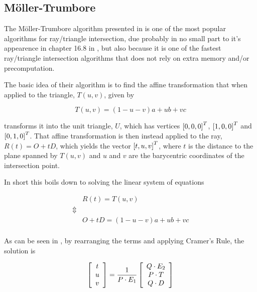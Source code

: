 \subsection{Möller-Trumbore}


The Möller-Trumbore algorithm presented in 
is one of the most popular algorithms for ray/triangle intersection,
due probably in no small part to it's appearence in chapter 16.8 in
, but also because it is one of the fastest
ray/triangle intersection algorithms that does not rely on extra
memory and/or precomputation.



The basic idea of their algorithm is to find the affine transformation
that when applied to the triangle, $T(u,v)$, given by

\begin{displaymath}
  T(u,v) = (1-u-v)a + ub + vc
\end{displaymath}

transforms it into the unit triangle, $U$, which has vertices
$\left[0, 0, 0 \right]^T$, $\left[1, 0, 0 \right]^T$ and
$\left[0, 1, 0 \right]^T$. That affine transformation is then instead
applied to the ray, $R(t) = O + tD$, which yields the vector
$\left[t, u, v \right]^T$, where $t$ is the distance to the plane spanned
by $T(u,v)$ and $u$ and $v$ are the barycentric coordinates of the
intersection point.

In short this boils down to solving the linear system of equations

\begin{displaymath}
  \begin{array}{rl}
    & R(t) = T(u,v) \\
    \Updownarrow \\
    & O + tD = (1-u-v)a + ub + vc \\
  \end{array}
\end{displaymath}

As can be seen in , by rearranging the
terms and applying Cramer's Rule, the solution is

\begin{displaymath}
  \left[\begin{array}{c} t \\ u \\ v \end{array}\right] = \frac{1}{P \cdot E_1} 
  \left[\begin{array}{c} Q \cdot E_2 \\ P \cdot T \\ Q \cdot D \end{array}\right]
\end{displaymath}

